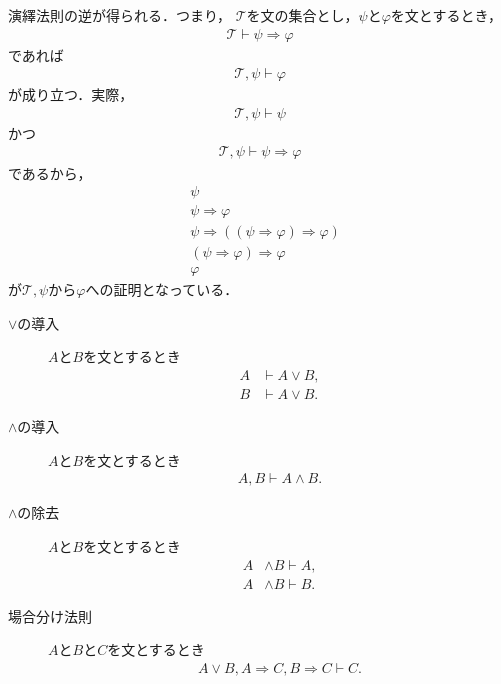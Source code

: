 	演繹法則の逆が得られる．つまり，
	$\mathscr{T}$を文の集合とし，$\psi$と$\varphi$を文とするとき，
	\begin{align}
		\mathscr{T} \vdash \psi \Longrightarrow \varphi
	\end{align}
	であれば
	\begin{align}
		\mathscr{T},\psi \vdash \varphi
	\end{align}
	が成り立つ．実際，
	\begin{align}
		\mathscr{T},\psi \vdash \psi
	\end{align}
	かつ
	\begin{align}
		\mathscr{T},\psi \vdash \psi \Longrightarrow \varphi
	\end{align}
	であるから，
	\begin{align}
		&\psi \\
		&\psi \Longrightarrow \varphi \\
		&\psi \Longrightarrow ((\psi \Longrightarrow \varphi) \Longrightarrow \varphi) \\
		&(\psi \Longrightarrow \varphi) \Longrightarrow \varphi \\
		&\varphi
	\end{align}
	が$\mathscr{T},\psi$から$\varphi$への証明となっている．
	
	\begin{description}
		\item[$\vee$の導入] $A$と$B$を文とするとき
			\begin{align}
				A &\vdash A \vee B, \\
				B &\vdash A \vee B.
			\end{align}
		
		\item[$\wedge$の導入] $A$と$B$を文とするとき
			\begin{align}
				A,B \vdash A \wedge B.
			\end{align}
		
		\item[$\wedge$の除去] $A$と$B$を文とするとき
			\begin{align}
				A &\wedge B \vdash A, \\
				A &\wedge B \vdash B.
			\end{align}
			
		\item[場合分け法則] $A$と$B$と$C$を文とするとき
			\begin{align}
				A \vee B, A \Longrightarrow C, B \Longrightarrow C \vdash C.
			\end{align}
	\end{description}
	
